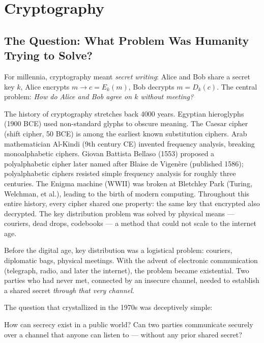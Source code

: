 
\chapter{Cryptography}
\label{ch:cryptography}

\section{The Question: What Problem Was Humanity Trying to Solve?}
\label{sec:crypto:question}

For millennia, cryptography meant \emph{secret writing}: Alice and Bob share a secret key $k$, Alice encrypts $m \to c = E_k(m)$, Bob decrypts $m = D_k(c)$. The central problem: \emph{How do Alice and Bob agree on $k$ without meeting?}

The history of cryptography stretches back 4000 years. Egyptian hieroglyphs (1900 BCE) used non-standard glyphs to obscure meaning. The Caesar cipher (shift cipher, 50 BCE) is among the earliest known substitution ciphers. Arab mathematician Al-Kindi (9th century CE) invented frequency analysis, breaking monoalphabetic ciphers. Giovan Battista Bellaso (1553) proposed a polyalphabetic cipher later named after Blaise de Vigenère (published 1586); polyalphabetic ciphers resisted simple frequency analysis for roughly three centuries. The Enigma machine (WWII) was broken at Bletchley Park (Turing, Welchman, et al.), leading to the birth of modern computing. Throughout this entire history, every cipher shared one property: the same key that encrypted also decrypted. The key distribution problem was solved by physical means — couriers, dead drops, codebooks — a method that could not scale to the internet age.

Before the digital age, key distribution was a logistical problem: couriers, diplomatic bags, physical meetings. With the advent of electronic communication (telegraph, radio, and later the internet), the problem became existential. Two parties who had never met, connected by an insecure channel, needed to establish a shared secret \emph{through that very channel}.

The question that crystallized in the 1970s was deceptively simple:

How can secrecy exist in a public world? Can two parties communicate securely over a channel that anyone can listen to — without any prior shared secret?

